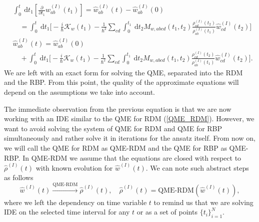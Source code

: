 \begin{equation}
\label{derivation_of_RBP_correction}
    \begin{aligned}
     &\int_{0}^{t} \mathrm{~d} t_1 \left[\frac{\partial}{\partial t_1} \hat{w}^{(I)}_{ab}(t_1)\right] =  \hat{w}^{(I)}_{ab}(t) - \hat{w}^{(I)}_{ab}(0)\\
     &\quad=\int_{0}^{t} \mathrm{~d} t_1 \Big[ -\frac{i}{\hbar} \mathcal{K}_w(t_1) -\frac{1}{\hbar^{2}} \sum_{cd}\int_{0}^{t_1} \mathrm{~d} t_2 M_{w, abcd} (t_1, t_2) \frac{\rho^{(I)}_{cd}(t_2) }{ \rho^{(I)}_{ab}(t_1)}\hat{w}^{(I)}_{cd}(t_2) \Big] \\
    &\hat{w}^{(I)}_{ab}(t) = \hat{w}^{(I)}_{ab}(0)   \\
     &\quad+\int_{0}^{t} \mathrm{~d} t_1 \Big[ -\frac{i}{\hbar} \mathcal{K}_w(t_1) -\frac{1}{\hbar^{2}} \sum_{cd}\int_{0}^{t_1} \mathrm{~d} t_2 M_{w, abcd} (t_1, t_2) \frac{\rho^{(I)}_{cd}(t_2) }{ \rho^{(I)}_{ab}(t_1)}\hat{w}^{(I)}_{cd}(t_2) \Big].
    \end{aligned}
\end{equation}
We are left with an exact form for solving the QME, separated into the RDM and the RBP. From this point, the quality of the approximate equations will depend on the assumptions we take into account.

The immediate observation from the previous equation is that we are now working with an IDE similar to the QME for RDM (\ref{QME_RDM}). However, we want to avoid solving the system of QME for RDM and QME for RBP simultaneously and rather solve it in iterations for the ansatz itself. From now on, we will call the QME for RDM as QME-RDM and the QME for RBP as QME-RBP. In QME-RDM we assume that the equations are closed with respect to $\hat{\rho}^{(I)}(t)$ with known evolution for $\hat{w}^{(I)}(t)$. We can note such abstract steps as follows
\begin{equation}
    \hat{w}^{(I)}(t) \overset{\text{QME-RDM}}{\longrightarrow} \hat{\rho}^{(I)}(t), \quad \hat{\rho}^{(I)}(t) = \text{QME-RDM} (\hat{w}^{(I)}(t)),
\end{equation}
where we left the dependency on time variable $t$ to remind us that we are solving IDE on the selected time interval for any $t$ or as a set of points $\{t_i\}_{i=1}^N$.

